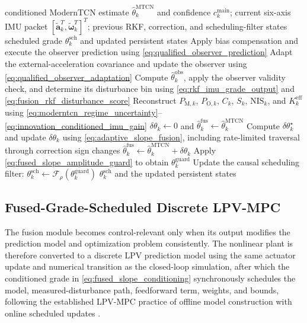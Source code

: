 \documentclass{ieeeaccess}
\newcommand{\citep}[1]{\cite{#1}}
\begin{document}
\begin{algorithm}[!t]
\caption{Online uncertainty-adaptive grade fusion and control-side scheduling}
\label{alg:online_slope_fusion}
\begin{algorithmic}[1]
\Require conditioned ModernTCN estimate $\hat\theta_k^{\mathrm{MTCN}}$ and confidence $c_k^{\mathrm{main}}$; current six-axis IMU packet $[\tilde{\bm a}_k^{T},\tilde{\bm\omega}_k^{T}]^{T}$; previous RKF, correction, and scheduling-filter states
\Ensure scheduled grade $\theta_k^{\mathrm{sch}}$ and updated persistent states
\State Apply bias compensation and execute the observer prediction using \eqref{eq:qualified_observer_prediction}
\State Adapt the external-acceleration covariance and update the observer using \eqref{eq:qualified_observer_adaptation}
\State Compute $\hat\theta_k^{\mathrm{obs}}$, apply the observer validity check, and determine its disturbance bin using \eqref{eq:rkf_imu_grade_output} and \eqref{eq:fusion_rkf_disturbance_score}
\State Reconstruct $P_{\mathrm{M},k}$, $P_{\mathrm{O},k}$, $C_k$, $S_k$, $\mathrm{NIS}_k$, and $K_k^{\mathrm{eff}}$ using \eqref{eq:moderntcn_regime_uncertainty}--\eqref{eq:innovation_conditioned_imu_gain}
    \State $\delta\theta_k\gets0$ and $\hat\theta_k^{\mathrm{fus}}\gets\hat\theta_k^{\mathrm{MTCN}}$ 
\Else
    \State Compute $\delta\theta_k^{\star}$ and update $\delta\theta_k$ using \eqref{eq:adaptive_slope_fusion}, including rate-limited traversal through correction sign changes
    \State $\hat\theta_k^{\mathrm{fus}}\gets\hat\theta_k^{\mathrm{MTCN}}+\delta\theta_k$
\EndIf
\State Apply \eqref{eq:fused_slope_amplitude_guard} to obtain $\theta_k^{\mathrm{guard}}$
\State Update the causal scheduling filter: $\theta_k^{\mathrm{sch}}\gets\mathcal F_{\rho}(\theta_k^{\mathrm{guard}})$
\State \Return $\theta_k^{\mathrm{sch}}$ and the updated persistent states
\end{algorithmic}
\end{algorithm}

\subsection{Fused-Grade-Scheduled Discrete LPV-MPC}
\label{sec:model_lpv_mpc}

The fusion module becomes control-relevant only when its output modifies the prediction model and optimization problem consistently. The nonlinear plant is therefore converted to a discrete LPV prediction model using the same actuator update and numerical transition as the closed-loop simulation, after which the conditioned grade in \eqref{eq:fused_slope_conditioning} synchronously schedules the model, measured-disturbance path, feedforward term, weights, and bounds, following the established LPV-MPC practice of offline model construction with online scheduled updates \citep{Uchihori2021AUVLPVMPC}.
\end{document}
